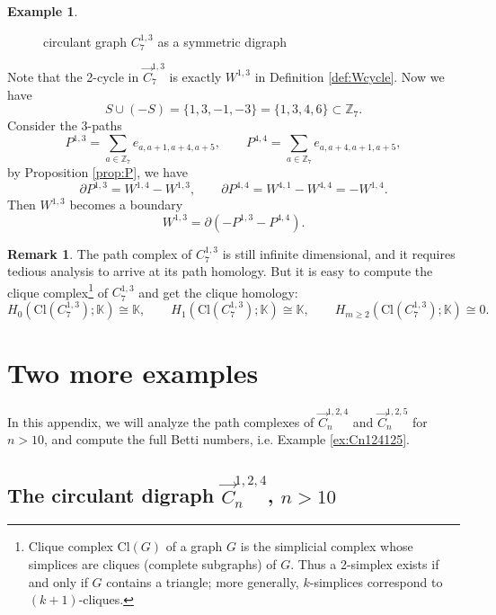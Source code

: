 \documentclass[11pt]{amsart}
\newcommand{\Z}{\mathbb Z}
\newcommand{\K}{\mathbb K}
\theoremstyle{plain}
\theoremstyle{definition}
\newtheorem{example}[theorem]{Example}
\newtheorem{remark}[theorem]{Remark}
\numberwithin{equation}{section}
\begin{document}
\begin{example}
\begin{figure}[h]
\begin{tikzpicture}[
  scale=0.8,
  >=Stealth,
  node/.style={inner sep=0.6pt}
]
\end{tikzpicture}
\caption{circulant graph $C_7^{1,3}$ as a symmetric digraph}
\label{fig:C713pm}
\end{figure}


\noindent Note that the 2-cycle in $\vec{C}_7^{1,3}$ is exactly $W^{1,3}$ in Definition \ref{def:Wcycle}. Now we have
\[S\cup (-S)=\{1,3,-1,-3\}=\{1,3,4,6\}\subset \Z_7.\]
Consider the $3$-paths
\[P^{1,3}=\sum_{a\in\Z_7}e_{a,a+1,a+4,a+5},\qquad P^{4,4}=\sum_{a\in\Z_7}e_{a,a+4,a+1,a+5},\]
by Proposition \ref{prop:P}, we have
\[\partial P^{1,3}=W^{1,4}-W^{1,3},\qquad \partial P^{4,4}=W^{4,1}-W^{4,4}=-W^{1,4}.\]
Then $W^{1,3}$ becomes a boundary
\[W^{1,3}=\partial(-P^{1,3}-P^{4,4}).\]


\end{example}


\begin{remark} The path complex of $C_7^{1,3}$ is still infinite dimensional, and it requires tedious analysis to arrive at its path homology. But it is easy to compute the clique complex\footnote{Clique complex $\mathrm{Cl}(G)$ of a graph $G$ is the simplicial complex whose simplices are cliques (complete subgraphs) of $G$. Thus a 2-simplex exists if and only if $G$ contains a triangle; more generally, $k$-simplices correspond to $(k+1)$-cliques.} of $C_7^{1,3}$ and get the clique homology:
\[H_0(\mathrm{Cl}(C_7^{1,3});\K)\cong\K,\qquad H_1(\mathrm{Cl}(C_7^{1,3});\K)\cong\K,\qquad H_{m\ge 2}(\mathrm{Cl}(C_7^{1,3});\K)\cong0.\]
\end{remark}

\bigskip
\appendix

\section{Two more examples}\label{appendix}

In this appendix, we will analyze the path complexes of $\vec{C}_n^{1,2,4}$ and $\vec{{C}}_n^{1,2,5}$ for $n>10$, and compute the full Betti numbers, i.e. Example \ref{ex:Cn124125}.


\subsection{The circulant digraph \texorpdfstring{$\vec{C}_n^{1,2,4}$, $n>10$}{124}}
\end{document}
